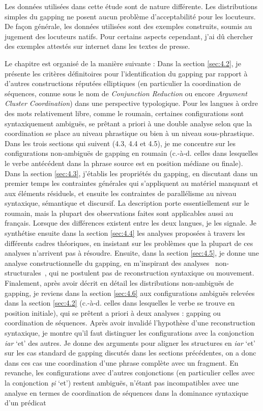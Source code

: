 Les données utilisées dans cette étude sont de nature différente. Les distributions simples du gapping ne posent aucun problème d'acceptabilité pour les locuteurs. De façon générale, les données utilisées sont des exemples construits, soumis au jugement des locuteurs natifs. Pour certains aspects cependant, j'ai dû chercher des exemples attestés sur internet dans les textes de presse. 

Le chapitre est organisé de la manière suivante : Dans la section \ref{sec:4.2}, je présente les critères définitoires pour l'identification du gapping par rapport à d'autres constructions réputées elliptiques (en particulier la coordination de séquences, connue sous le nom de \textit{Conjunction Reduction} ou encore \textit{Argument Cluster Coordination}) dans une perspective typologique. Pour les langues à ordre des mots relativement libre, comme le roumain, certaines configurations sont syntaxiquement ambiguës, se prêtant a priori à une double analyse selon que la coordination se place au niveau phrastique ou bien à un niveau sous-phrastique. Dans les trois sections qui suivent (4.3, 4.4 et 4.5), je me concentre sur les configurations non-ambiguës de gapping en roumain (c.-à-d. celles dans lesquelles le verbe antécédent dans la phrase source est en position médiane ou finale). Dans la section \ref{sec:4.3}, j'établis les propriétés du gapping, en discutant dans un premier temps les contraintes générales qui s'appliquent au matériel manquant et aux éléments résiduels, et ensuite les contraintes de parallélisme au niveau syntaxique, sémantique et discursif. La description porte essentiellement sur le roumain, mais la plupart des observations faites sont applicables aussi au français. Lorsque des différences existent entre les deux langues, je les signale. Je synthétise ensuite dans la section \ref{sec:4.4} les analyses proposées à travers les différents cadres théoriques, en insistant sur les problèmes que la plupart de ces analyses n'arrivent pas à résoudre. Ensuite, dans la section \ref{sec:4.5}, je donne une analyse constructionnelle du gapping, en m'inspirant des analyses {\guillemotleft}~non-structurales~{\guillemotright}, qui ne postulent pas de reconstruction syntaxique ou mouvement. Finalement, après avoir décrit en détail les distributions non-ambiguës de gapping, je reviens dans la section \ref{sec:4.6} aux configurations ambiguës relevées dans la section \ref{sec:4.2} (c.-à-d. celles dans lesquelles le verbe se trouve en position initiale), qui se prêtent a priori à deux analyses : gapping ou coordination de séquences. Après avoir invalidé l'hypothèse d'une reconstruction syntaxique, je montre qu'il faut distinguer les configurations avec la conjonction \textit{iar} `et' des autres. Je donne des arguments pour aligner les structures en \textit{iar} `et' sur les cas standard de gapping discutés dans les sections précédentes, on a donc dans ces cas une coordination d'une phrase complète avec un fragment. En revanche, les configurations avec d'autres conjonctions (en particulier celles avec la conjonction \textit{şi} `et') restent ambiguës, n'étant pas incompatibles avec une analyse en termes de coordination de séquences dans la dominance syntaxique d'un prédicat 